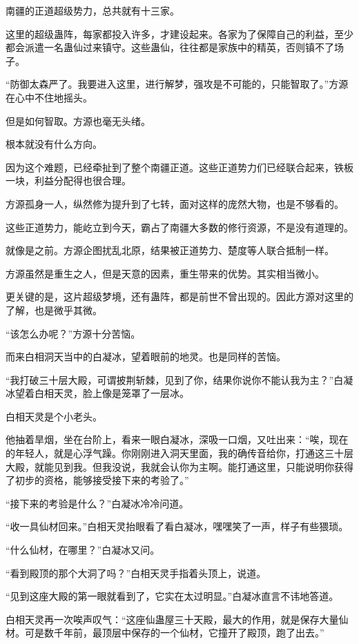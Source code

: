 \begin{this_body}
南疆的正道超级势力，总共就有十三家。

这里的超级蛊阵，每家都投入许多，才建设起来。各家为了保障自己的利益，至少都会派遣一名蛊仙过来镇守。这些蛊仙，往往都是家族中的精英，否则镇不了场子。

“防御太森严了。我要进入这里，进行解梦，强攻是不可能的，只能智取了。”方源在心中不住地摇头。

但是如何智取。方源也毫无头绪。

根本就没有什么方向。

因为这个难题，已经牵扯到了整个南疆正道。这些正道势力们已经联合起来，铁板一块，利益分配得也很合理。

方源孤身一人，纵然修为提升到了七转，面对这样的庞然大物，也是不够看的。

这些正道势力，能屹立到今天，霸占了南疆大多数的修行资源，不是没有道理的。

就像是之前。方源企图扰乱北原，结果被正道势力、楚度等人联合抵制一样。

方源虽然是重生之人，但是天意的因素，重生带来的优势。其实相当微小。

更关键的是，这片超级梦境，还有蛊阵，都是前世不曾出现的。因此方源对这里的了解，也是微乎其微。

“该怎么办呢？”方源十分苦恼。

而来白相洞天当中的白凝冰，望着眼前的地灵。也是同样的苦恼。

“我打破三十层大殿，可谓披荆斩棘，见到了你，结果你说你不能认我为主？”白凝冰望着白相天灵，脸上像是笼罩了一层冰。

白相天灵是个小老头。

他抽着旱烟，坐在台阶上，看来一眼白凝冰，深吸一口烟，又吐出来：“唉，现在的年轻人，就是心浮气躁。你刚刚进入洞天里面，我的确传音给你，打通这三十层大殿，就能见到我。但我没说，我就会认你为主啊。能打通这里，只能说明你获得了初步的资格，能够接受接下来的考验了。”

“接下来的考验是什么？”白凝冰冷冷问道。

“收一具仙材回来。”白相天灵抬眼看了看白凝冰，嘿嘿笑了一声，样子有些猥琐。

“什么仙材，在哪里？”白凝冰又问。

“看到殿顶的那个大洞了吗？”白相天灵手指着头顶上，说道。

“见到这座大殿的第一眼就看到了，它实在太过明显。”白凝冰直言不讳地答道。

白相天灵再一次唉声叹气：“这座仙蛊屋三十天殿，最大的作用，就是保存大量仙材。可是数千年前，最顶层中保存的一个仙材，它撞开了殿顶，跑了出去。”


\end{this_body}
